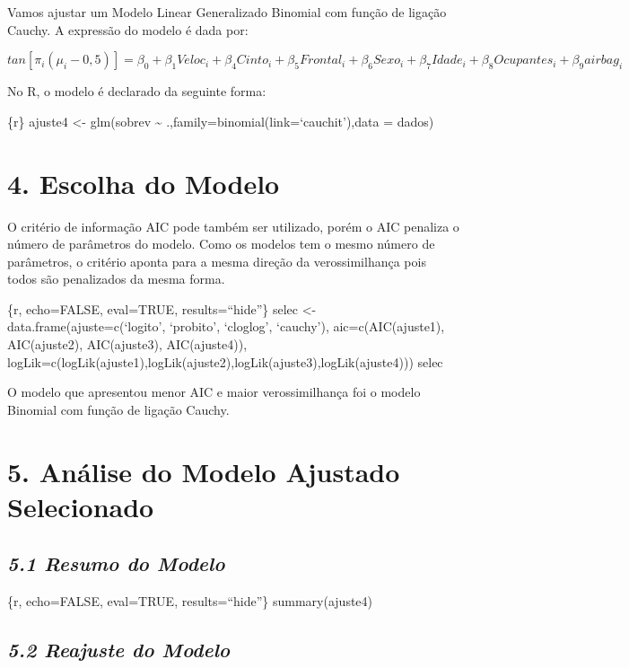 \documentclass[]{article}
\begin{document}
Vamos ajustar um Modelo Linear Generalizado Binomial com função de
ligação Cauchy. A expressão do modelo é dada por:

\(tan[\pi_i(\mu_i- 0,5)] = \beta_0 + \beta_1 Veloc_i + \beta_4 Cinto_i + \beta_5 Frontal_i + \beta_6 Sexo_i + \beta_7 Idade_i + \beta_8 Ocupantes_i + \beta_9 airbag_i\)

No R, o modelo é declarado da seguinte forma:

\{r\} ajuste4 \textless{}- glm(sobrev \textasciitilde{}
.,family=binomial(link=`cauchit'),data = dados)

\section{4. Escolha do Modelo}\label{escolha-do-modelo}

O critério de informação AIC pode também ser utilizado, porém o AIC
penaliza o número de parâmetros do modelo. Como os modelos tem o mesmo
número de parâmetros, o critério aponta para a mesma direção da
verossimilhança pois todos são penalizados da mesma forma.

\{r, echo=FALSE, eval=TRUE, results=``hide''\} selec \textless{}-
data.frame(ajuste=c(`logito', `probito', `cloglog', `cauchy'),
aic=c(AIC(ajuste1), AIC(ajuste2), AIC(ajuste3), AIC(ajuste4)),
logLik=c(logLik(ajuste1),logLik(ajuste2),logLik(ajuste3),logLik(ajuste4)))
selec

O modelo que apresentou menor AIC e maior verossimilhança foi o modelo
Binomial com função de ligação Cauchy.

\section{5. Análise do Modelo Ajustado
Selecionado}\label{analise-do-modelo-ajustado-selecionado}

\subsection{\texorpdfstring{\emph{5.1 Resumo do
Modelo}}{5.1 Resumo do Modelo}}\label{resumo-do-modelo}

\{r, echo=FALSE, eval=TRUE, results=``hide''\} summary(ajuste4)

\subsection{\texorpdfstring{\emph{5.2 Reajuste do
Modelo}}{5.2 Reajuste do Modelo}}\label{reajuste-do-modelo}
\end{document}
